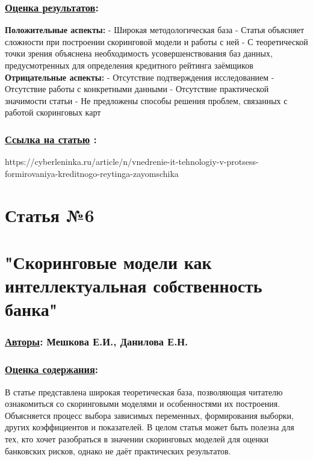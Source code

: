 \documentclass[a4paper,14pt]{article}
\begin{document}
\subsubsection*{\underline{Оценка результатов}:}
\textbf{Положительные аспекты:} \newline
- Широкая методологическая база \newline
- Статья объясняет сложности при построении скоринговой модели и работы с ней \newline
- С теоретической точки зрения объяснена необходимость усовершенствования баз данных, предусмотренных для определения кредитного рейтинга заёмщиков \vspace{10pt} \newline
\textbf{Отрицательные аспекты:} \newline
- Отсутствие подтверждения исследованием \newline
- Отсутствие работы с конкретными данными \newline
- Отсутствие практической значимости статьи \newline
- Не предложены способы решения проблем, связанных с работой скоринговых карт \newline

\subsubsection*{\underline{Ссылка на статью} :}
https://cyberleninka.ru/article/n/vnedrenie-it-tehnologiy-v-protsess-formirovaniya-kreditnogo-reytinga-zayomschika



\newpage

\section*{Статья №6}
\section*{"Скоринговые модели как интеллектуальная собственность банка"}
\subsubsection*{\underline {Авторы}: Мешкова Е.И., Данилова Е.Н.}
\subsubsection*{\underline{Оценка содержания}:}
В статье представлена широкая теоретическая база, позволяющая читателю ознакомиться со скоринговыми моделями и особенностями их построения. Объясняется процесс выбора зависимых переменных, формирования выборки, других коэффициентов и показателей. В целом статья может быть полезна для тех, кто хочет разобраться в значении скоринговых моделей для оценки банковских рисков, однако не даёт практических результатов.
\end{document}
